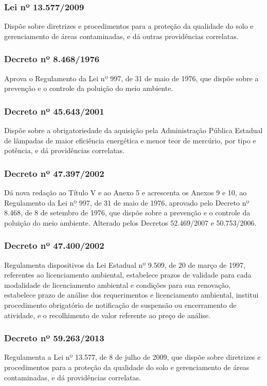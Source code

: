 \begin{subapend}
\begin{subsubapend}
		\subsubsection{Lei nº 13.577/2009}
		Dispõe sobre diretrizes e procedimentos para a proteção da qualidade do solo e gerenciamento de áreas contaminadas, e dá outras providências correlatas.
		\subsubsection{Decreto nº 8.468/1976}
		Aprova o Regulamento da Lei nº 997, de 31 de maio de 1976, que dispõe sobre a prevenção e o controle da poluição do meio ambiente.
		\subsubsection{Decreto nº 45.643/2001}
		Dispõe sobre a obrigatoriedade da aquisição pela Administração Pública Estadual de lâmpadas de maior eficiência energética e menor teor de mercúrio, por tipo e potência, e dá providências correlatas.
		\subsubsection{Decreto nº 47.397/2002}
		Dá nova redação ao Título V e ao Anexo 5 e acrescenta os Anexos 9 e 10, ao Regulamento da Lei nº 997, de 31 de maio de 1976, aprovado pelo Decreto nº 8.468, de 8 de setembro de 1976, que dispõe sobre a prevenção e o controle da poluição do meio ambiente. Alterado pelos Decretos 52.469/2007 e 50.753/2006.
		\subsubsection{Decreto nº 47.400/2002}
		Regulamenta dispositivos da Lei Estadual nº 9.509, de 20 de março de 1997, referentes ao licenciamento ambiental, estabelece prazos de validade para cada modalidade de licenciamento ambiental e condições para sua renovação, estabelece prazo de análise dos requerimentos e licenciamento ambiental, institui procedimento obrigatório de notificação de suspensão ou encerramento de atividade, e o recolhimento de valor referente ao preço de análise.
		\subsubsection{Decreto nº 59.263/2013}
		Regulamenta a Lei nº 13.577, de 8 de julho de 2009, que dispõe sobre diretrizes e procedimentos para a proteção da qualidade do solo e gerenciamento de áreas contaminadas, e dá providências correlatas.

\end{subsubapend}
\end{subapend}
